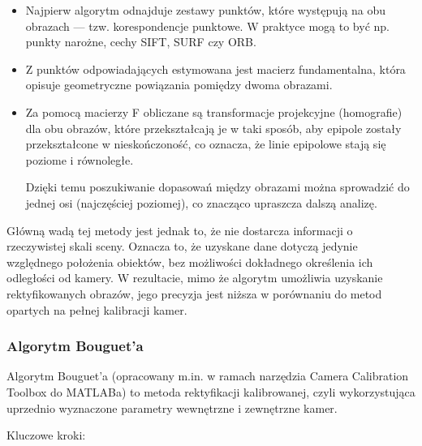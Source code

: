 \documentclass[magisterska]{pracadypl}
\begin{document}
\begin{itemize}
\item Najpierw algorytm odnajduje zestawy punktów, które występują na obu obrazach — tzw. korespondencje punktowe. W praktyce mogą to być np. punkty narożne, cechy SIFT, SURF czy ORB.

\item Z punktów odpowiadających estymowana jest macierz fundamentalna, która opisuje geometryczne powiązania pomiędzy dwoma obrazami.

\item Za pomocą macierzy F obliczane są transformacje projekcyjne (homografie) dla obu obrazów, które przekształcają je w taki sposób, aby epipole zostały przekształcone w nieskończoność, co oznacza, że linie epipolowe stają się poziome i równoległe.

Dzięki temu poszukiwanie dopasowań między obrazami można sprowadzić do jednej osi (najczęściej poziomej), co znacząco upraszcza dalszą analizę.
\end{itemize}

Główną wadą tej metody jest jednak to, że nie dostarcza informacji o rzeczywistej skali sceny. Oznacza to, że uzyskane dane dotyczą jedynie względnego położenia obiektów, bez możliwości dokładnego określenia ich odległości od kamery. W rezultacie, mimo że algorytm umożliwia uzyskanie rektyfikowanych obrazów, jego precyzja jest niższa w porównaniu do metod opartych na pełnej kalibracji kamer.

\subsubsection{Algorytm Bouguet'a}

Algorytm Bouguet’a (opracowany m.in. w ramach narzędzia Camera Calibration Toolbox do MATLABa) to metoda rektyfikacji kalibrowanej, czyli wykorzystująca uprzednio wyznaczone parametry wewnętrzne i zewnętrzne kamer.

\bigskip

Kluczowe kroki:
\end{document}
